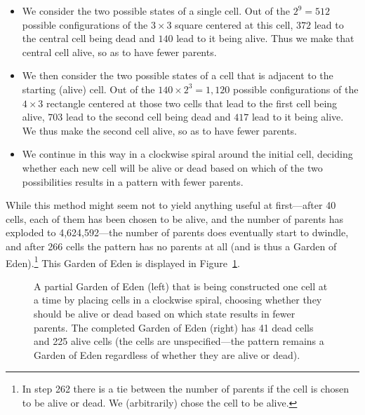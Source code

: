 \begin{itemize}
	\item We consider the two possible states of a single cell. Out of the $2^9 = 512$ possible configurations of the $3 \times 3$ square centered at this cell, $372$ lead to the central cell being dead and $140$ lead to it being alive. Thus we make that central cell alive, so as to have fewer parents.\smallskip
	
	\item We then consider the two possible states of a cell that is adjacent to the starting (alive) cell. Out of the $140 \times 2^3 = 1,120$ possible configurations of the $4 \times 3$ rectangle centered at those two cells that lead to the first cell being alive, $703$ lead to the second cell being dead and $417$ lead to it being alive. We thus make the second cell alive, so as to have fewer parents.\smallskip
	
	\item We continue in this way in a clockwise spiral around the initial cell, deciding whether each new cell will be alive or dead based on which of the two possibilities results in a pattern with fewer parents.\medskip
\end{itemize}

While this method might seem not to yield anything useful at first---after 40 cells, each of them has been chosen to be alive, and the number of parents has exploded to 4,624,592---the number of parents does eventually start to dwindle, and after 266 cells the pattern has no parents at all (and is thus a Garden of Eden).\footnote{In step 262 there is a tie between the number of parents if the cell is chosen to be alive or dead. We (arbitrarily) chose the cell to be alive.} This Garden of Eden is displayed in Figure~\ref{fig:goe_1}.

\begin{figure}[!htb]
	\centering{}
	
	\caption{A partial Garden of Eden (left) that is being constructed one cell at a time by placing cells in a clockwise spiral, choosing whether they should be alive or dead based on which state results in fewer parents. The completed Garden of Eden (right) has 41 dead cells and 225 alive cells (the  cells are unspecified---the pattern remains a Garden of Eden regardless of whether they are alive or dead).}\label{fig:goe_1}
\end{figure}

